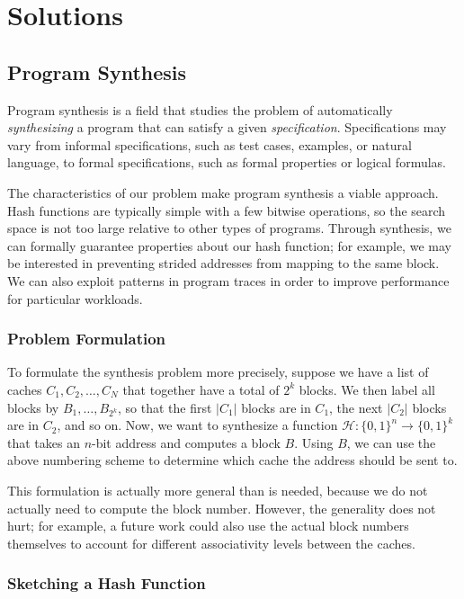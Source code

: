 \section{Solutions}
\label{sec:Solution}

\subsection{Program Synthesis}

Program synthesis \cite{program-synthesis-survey} is a field that studies the
problem of automatically \textit{synthesizing} a program that can satisfy a
given \textit{specification}. Specifications may vary from informal
specifications, such as test cases, examples, or natural language, to formal
specifications, such as formal properties or logical formulas.

The characteristics of our problem make program synthesis a viable approach.
Hash functions are typically simple with a few bitwise operations, so the search
space is not too large relative to other types of programs. Through synthesis,
we can formally guarantee properties about our hash function; for example, we
may be interested in preventing strided addresses from mapping to the same
block. We can also exploit patterns in program traces in order to improve
performance for particular workloads.

\subsubsection{Problem Formulation}

To formulate the synthesis problem more precisely, suppose we have a list of
caches $C_1, C_2, \dots, C_N$ that together have a total of $2^k$ blocks. We
then label all blocks by $B_1, \dots, B_{2^k}$, so that the first $|C_1|$ blocks
are in $C_1$, the next $|C_2|$ blocks are in $C_2$, and so on. Now, we want to
synthesize a function $\mathcal{H} : \{0,1\}^n \to \{0,1\}^k$ that takes an $n$-bit
address and computes a block $B$. Using $B$, we can use the above numbering
scheme to determine which cache the address should be sent to.

This formulation is actually more general than is needed, because we do not
actually need to compute the block number. However, the generality does not
hurt; for example, a future work could also use the actual block numbers
themselves to account for different associativity levels between the caches.

\subsubsection{Sketching a Hash Function}

